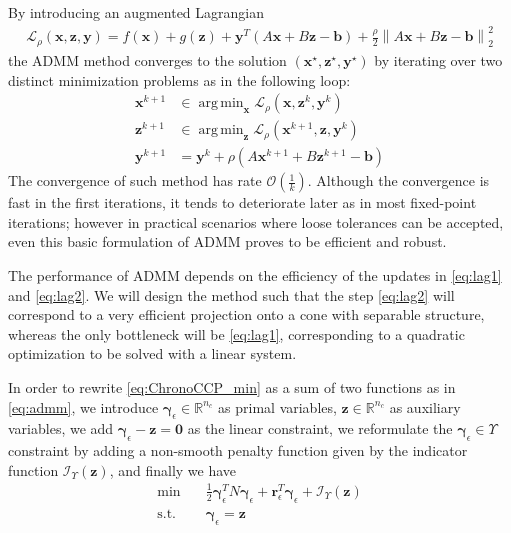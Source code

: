 \documentclass[AMA,STIX1COL]{WileyNJD-v2}
\newcommand{\vect}[1]{\bm{#1}}
\newcommand{\norm}[1]{\left\lVert#1\right\rVert}
\DeclareMathOperator*{\argmin}{arg\,min} %
\begin{document}
By introducing an augmented Lagrangian
\begin{align}
\mathcal{L}_{\rho}(\vect{x},\vect{z},\vect{y})= f(\vect{x}) + g(\vect{z}) + \vect{y}^T (A \vect{x} + B \vect{z} - \vect{b}) + \frac{\rho}{2} \norm{A \vect{x} + B \vect{z} - \vect{b}}_2^2
\end{align}
the ADMM method converges to the solution $(\vect{x}^\star,\vect{z}^\star,\vect{y}^\star)$ by iterating over two distinct minimization problems as in the following loop:
\begin{align}
 \vect{x}^{k+1} &\in \argmin_{\vect{x}} \mathcal{L}_{\rho}(\vect{x},\vect{z}^k,\vect{y}^k) \label{eq:lag1}\\
 \vect{z}^{k+1} &\in \argmin_{\vect{z}} \mathcal{L}_{\rho}(\vect{x}^{k+1},\vect{z},\vect{y}^k) \label{eq:lag2}\\
 \vect{y}^{k+1} &= \vect{y}^{k} + \rho ( A \vect{x}^{k+1} + B \vect{z}^{k+1} - \vect{b} )
 \label{eq:admm_iters}
\end{align}
The convergence of such method has rate $\mathcal{O}\left(\frac{1}{k}\right)$.
Although the convergence is fast in the first iterations, it tends to deteriorate later as in most fixed-point iterations; however in practical scenarios where loose tolerances can be accepted, even this basic formulation of ADMM proves to be efficient and robust.

The performance of ADMM depends on the efficiency of the updates in \eqref{eq:lag1} and \eqref{eq:lag2}. We will design the method such that the step \eqref{eq:lag2} will correspond to a very efficient projection onto a cone with separable structure, whereas the only bottleneck will be \eqref{eq:lag1}, corresponding to a quadratic optimization to be solved with a linear system.


In order to rewrite \eqref{eq:ChronoCCP_min} as a sum of two functions as in \eqref{eq:admm}, we introduce 
$\vect{\gamma}_\epsilon \in \mathbb{R}^{n_c}$ as primal variables, 
$\vect{z} \in \mathbb{R}^{n_c}$ as auxiliary variables, 
we add $\vect{\gamma}_\epsilon - \vect{z} = \vect{0}$ as the linear constraint, 
we reformulate the $\vect{\gamma}_\epsilon \in \Upsilon$ constraint by adding a non-smooth penalty function given by the indicator function 
$\mathcal{I}_\Upsilon (\vect{z})$,
and finally we have
\begin{subequations}
	\begin{align}
    \text{min} \quad & \frac{1}{2} \vect{\gamma}_\epsilon^T N \vect{\gamma}_\epsilon + \vect{r}^T_\epsilon \vect{\gamma}_\epsilon  
		+  \mathcal{I}_\Upsilon(\vect{z})  \\
	  \text{s.t.} \quad & \vect{\gamma}_\epsilon =  \vect{z}
	\end{align}
	\label{eq:admm_mod}
\end{subequations}
\end{document}

